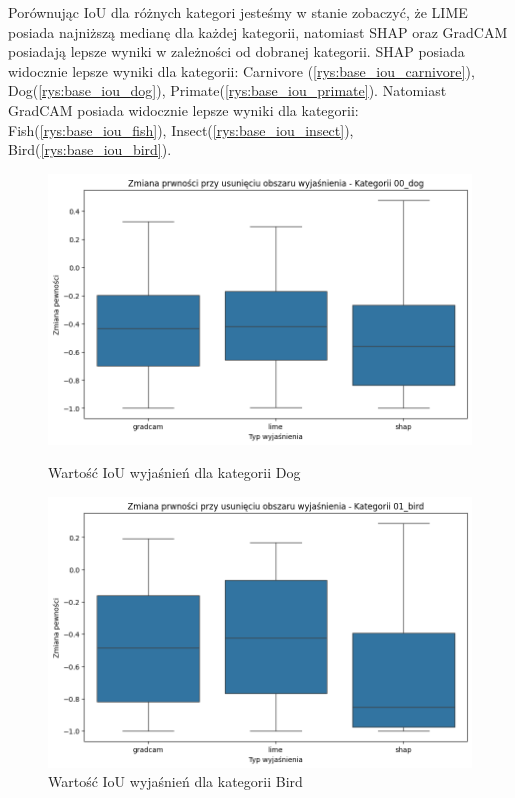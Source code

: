 Porównując IoU dla różnych kategori jesteśmy w stanie zobaczyć, że LIME posiada najniższą medianę dla każdej kategorii, natomiast SHAP oraz GradCAM posiadają lepsze wyniki w zależności od dobranej kategorii.
SHAP posiada widocznie lepsze wyniki dla kategorii: Carnivore (\ref{rys:base_iou_carnivore}), Dog(\ref{rys:base_iou_dog}), Primate(\ref{rys:base_iou_primate}).
Natomiast GradCAM posiada widocznie lepsze wyniki dla kategorii: Fish(\ref{rys:base_iou_fish}), Insect(\ref{rys:base_iou_insect}), Bird(\ref{rys:base_iou_bird}).

\begin{figure}
	\centering
	\begin{minipage}[b]{0.3\textwidth}
		\includegraphics[width=.9\textwidth]{img/base_confidence_mask_dog}
		\caption{Wartość IoU wyjaśnień dla kategorii Dog}  \label{rys:base_confidence_mask_dog}
	\end{minipage}
	\begin{minipage}[b]{0.3\textwidth}
		\centering\includegraphics[width=.9\textwidth]{img/base_confidence_mask_bird}
		\caption{Wartość IoU wyjaśnień dla kategorii Bird}  \label{rys:base_confidence_mask_bird}

\end{minipage}
\end{figure}
